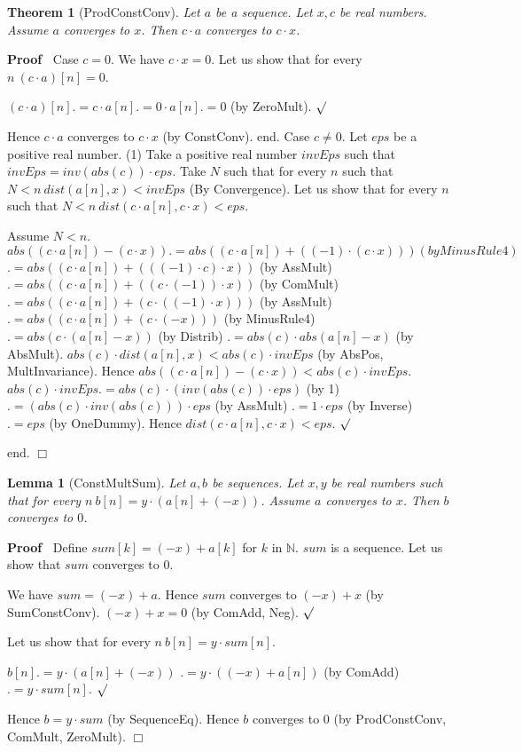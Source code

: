 \documentclass{article}
\newenvironment{forthel}{\begin{leftbar}}{\end{leftbar}}
\newenvironment{proof}{\noindent\textbf{Proof\ }}{\hspace*{\fill}$\Box$\medskip}
\newenvironment{subproof}{\begin{list}{}{}
		\item[\text{Proof}]}{\hfill $\surd$ \end{list}}
\newtheorem{lemma}{Lemma}
\newtheorem{theorem}{Theorem}
\newcommand{\NN}{\mathbb{N}}
\newcommand{\cdottwo}{\cdot}
\newcommand{\plustwo}{+}
\begin{document}
\begin{forthel}
	\begin{theorem}[ProdConstConv]
	Let $a$ be a sequence. Let $x,c$ be real numbers. Assume $a$ converges to $x$.
	Then $c \cdottwo a$ converges to $c \cdot x$.
	\end{theorem}
	\begin{proof}
	Case $c = 0$.
	We have $c \cdot x = 0$.
	Let us show that for every $n \ (c \cdottwo a)[n] = 0$. 
	\begin{subproof}
	$(c \cdottwo a)[n] .= c \cdot a[n]
	.= 0 \cdot a[n]
	.= 0$ (by ZeroMult).
	\end{subproof}
	Hence $c \cdottwo a$ converges to $c \cdot x$ (by ConstConv).
	end.
	Case $c \neq 0$.
	Let $eps$ be a positive real number. 
	(1)     Take a positive real number $invEps$ such that $invEps = inv(abs(c)) \cdot eps$.
	Take $N$ such that for every $n$ such that $N < n \ dist(a[n],x) < invEps$ (By Convergence).
	Let us show that for every $n$ such that $N < n \ dist(c \cdot a[n],c \cdot x) < eps$.
	\begin{subproof}
	Assume $N < n$.
	$abs((c \cdot a[n]) - (c \cdot x)) .= abs((c \cdot a[n]) +  ((-1) \cdot (c \cdot x))) (by MinusRule4)$ 
	$.= abs((c \cdot a[n]) + (((-1) \cdot c) \cdot x))$ (by AssMult)
	$.= abs((c \cdot a[n]) + ((c \cdot (-1)) \cdot x))$ (by ComMult)
	$.= abs((c \cdot a[n]) + (c \cdot ((-1) \cdot x)))$ (by AssMult)
	$.= abs((c \cdot a[n]) + (c \cdot (-x)))$ (by MinusRule4)
	$.= abs(c \cdot (a[n] - x))$ (by Distrib)
	$.= abs(c) \cdot abs(a[n] - x)$ (by AbsMult).
	$abs(c) \cdot dist(a[n],x) < abs(c) \cdot invEps$ (by AbsPos, MultInvariance).
	Hence $abs((c \cdot a[n]) - (c \cdot x)) < abs(c) \cdot invEps$.
	$abs(c) \cdot invEps .= abs(c) \cdot (inv(abs(c)) \cdot eps)$ (by 1)
	$.= (abs(c) \cdot inv(abs(c))) \cdot eps$ (by AssMult)
	$.= 1 \cdot eps$ (by Inverse)
	$.= eps$ (by OneDummy).
	Hence $dist(c \cdot a[n],c \cdot x) < eps$.
	\end{subproof}
	end.
	\end{proof}

	\begin{lemma}[ConstMultSum]
	Let $a,b$ be sequences. Let $x,y$ be real numbers such that for every $n\ b[n] = y \cdot (a[n] + (-x))$. Assume $a$ converges to $x$.
	Then $b$ converges to $0$.
	\end{lemma}
	\begin{proof}
	Define $sum[k] = (-x) + a[k]$ for $k$ in $\NN$.
	$sum$ is a sequence.
	Let us show that $sum$ converges to $0$.
	\begin{subproof}
	We have $sum = (-x) \plustwo a$.
	Hence $sum$ converges to $(-x) + x$ (by SumConstConv).
	$(-x) + x = 0$ (by ComAdd, Neg).
	\end{subproof}
	Let us show that for every $n\ b[n] = y \cdot sum[n]$.
	\begin{subproof}
	$b[n] .= y \cdot (a[n] + (-x))$
	$.= y \cdot ((-x) + a[n])$ (by ComAdd)
	$.= y \cdot sum[n]$.
	\end{subproof}
	Hence $b = y \cdottwo sum$ (by SequenceEq).
	Hence $b$ converges to $0$ (by ProdConstConv, ComMult, ZeroMult).
	\end{proof}
	

\end{forthel}
\end{document}
